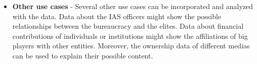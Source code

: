 \begin{itemize}
\item \textbf{Other use cases} - Several other use cases can be incorporated and analyzed with the data. Data about the IAS officers might show the possible relationships between the bureaucracy and the elites. Data about financial contributions of individuals or institutions might show the affiliations of big players with other entities. Moreover, the ownership data of different medias can be used to explain their possible content.

\end{itemize}
